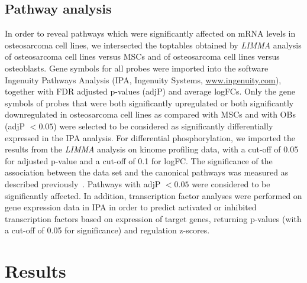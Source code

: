 \subsection{Pathway analysis}
In order to reveal pathways which were significantly affected on mRNA levels in osteosarcoma cell lines, we intersected the toptables obtained by {\it LIMMA} analysis of osteosarcoma cell lines versus MSCs and of osteosarcoma cell lines versus osteoblasts. Gene symbols for all probes were imported into the software Ingenuity Pathways Analysis (IPA, Ingenuity Systems, \url{www.ingenuity.com}), together with FDR adjusted p-values (adjP) and average logFCs. Only the gene symbols of probes that were both significantly upregulated or both significantly downregulated in osteosarcoma cell lines as compared with MSCs and with OBs (adjP $<0.05$) were selected to be considered as significantly differentially expressed in the IPA analysis. For differential phosphorylation, we imported the results from the {\it LIMMA} analysis on kinome profiling data, with a cut-off of 0.05 for adjusted p-value and a cut-off of 0.1 for logFC. The significance of the association between the data set and the canonical pathways was measured as described previously~\cite{mohseny2012activities}. Pathways with adjP $<0.05$ were considered to be significantly affected. In addition, transcription factor analyses were performed on gene expression data in IPA in order to predict activated or inhibited transcription factors based on expression of target genes, returning p-values (with a cut-off of 0.05 for significance) and regulation z-scores.

\section{Results}\label{results6}
